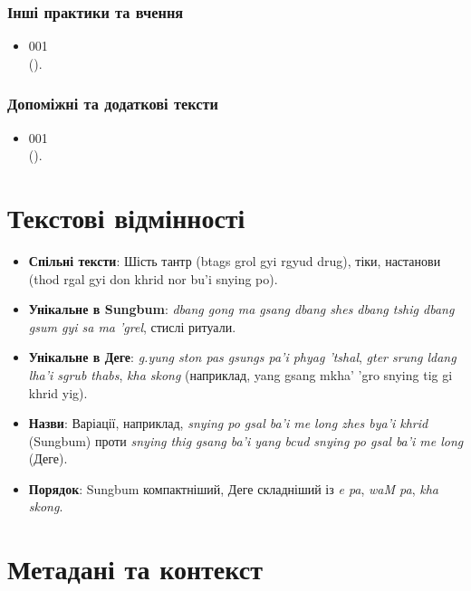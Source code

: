 \documentclass{article}
\begin{document}
\subsubsection{Інші практики та вчення}

\begingroup\raggedright
\begin{itemize}
\item 001  \\ (\texttt{}).
\end{itemize}
\endgroup

\subsubsection{Допоміжні та додаткові тексти}

\begingroup\raggedright
\begin{itemize}
\item 001  \\ (\texttt{}).
\end{itemize}
\endgroup

\newpage
\section{Текстові відмінності}

\begingroup\raggedright
\begin{itemize}
    \item \textbf{Спільні тексти}: Шість тантр (btags grol gyi rgyud drug), тіки, настанови (thod rgal gyi don khrid nor bu'i snying po).
    \item \textbf{Унікальне в Sungbum}: \textit{dbang gong ma gsang dbang shes dbang tshig dbang gsum gyi sa ma 'grel}, стислі ритуали.
    \item \textbf{Унікальне в Деге}: \textit{g.yung ston pas gsungs pa'i phyag 'tshal}, \textit{gter srung ldang lha'i sgrub thabs}, \textit{kha skong} (наприклад, yang gsang mkha' 'gro snying tig gi khrid yig).
    \item \textbf{Назви}: Варіації, наприклад, \textit{snying po gsal ba'i me long zhes bya'i khrid} (Sungbum) проти \textit{snying thig gsang ba'i yang bcud snying po gsal ba'i me long} (Деге).
    \item \textbf{Порядок}: Sungbum компактніший, Деге складніший із \textit{e pa}, \textit{waM pa}, \textit{kha skong}.
\end{itemize}
\endgroup

\newpage
\section{Метадані та контекст}
\end{document}
